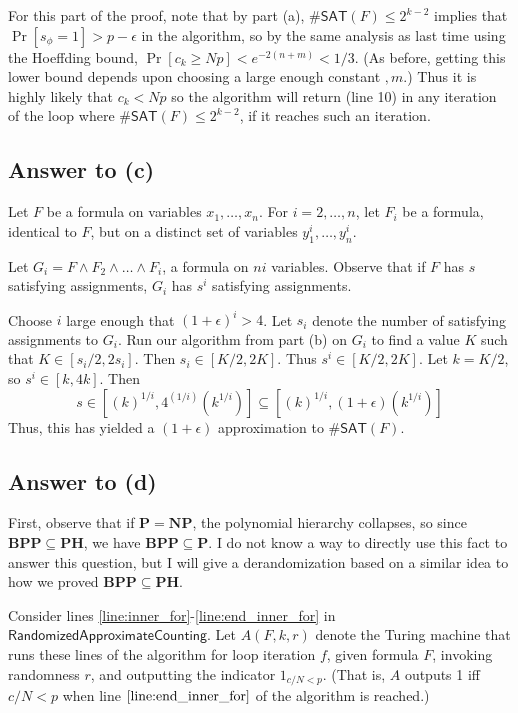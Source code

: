 \documentclass{article}
\renewcommand{\P}{\mathbf{P}}
\newcommand{\NP}{\mathbf{NP}}
\newcommand{\BPP}{\mathbf{BPP}}
\newcommand{\PH}{\mathbf{PH}}
\begin{document}
For this part of the proof, note that by part (a),
$\#\mathsf{SAT}(F) \leq 2^{k-2}$ implies that
$\Pr[s_\phi = 1] > p - \epsilon$ in the algorithm,
so by the same analysis as last time using the Hoeffding bound,
$\Pr[c_k \geq Np] < e^{-2(n + m)} < 1/3$.
(As before, getting this lower bound depends upon choosing a large enough constant $,m$.)
Thus it is highly likely that $c_k < Np$ so the algorithm will return (line 10)
in any iteration of the loop where $\#\mathsf{SAT}(F) \leq 2^{k-2}$,
if it reaches such an iteration.

\subsection*{Answer to (c)}

Let $F$ be a formula on variables $x_1, \dots, x_n$.
For $i = 2, \dots, n$, let $F_i$ be a formula, identical to $F$, but on a distinct set of variables $y^i_1, \dots, y^i_n$.

Let $G_i = F \wedge F_2 \wedge \dots \wedge F_i$, a formula on $ni$ variables.
Observe that if $F$ has $s$ satisfying assignments, $G_i$ has $s^i$ satisfying assignments.

Choose $i$ large enough that $(1 + \epsilon)^i > 4$.
Let $s_i$ denote the number of satisfying assignments to $G_i$.
Run our algorithm from part (b) on $G_i$ to find a value $K$ such that
$K \in [s_i/2, 2s_i]$.
Then $s_i \in [K/2, 2K]$.
Thus $s^i \in [K/2, 2K]$.
Let $k = K/2$, so $s^i \in [k, 4k]$.
Then $$s \in [(k)^{1/i}, 4^{(1/i)}(k^{1/i})] \subseteq [(k)^{1/i}, (1 + \epsilon)(k^{1/i})]$$
Thus, this has yielded a $(1 + \epsilon)$ approximation to $\#\mathsf{SAT}(F)$.

\subsection*{Answer to (d)}
First, observe that if $\P = \NP$, the polynomial hierarchy collapses, so since $\BPP \subseteq \PH$,
we have $\BPP \subseteq \P$.
I do not know a way to directly use this fact to answer this question, but I will give a derandomization based on a similar idea to how we proved $\BPP \subseteq \PH$.

Consider lines \ref{line:inner_for}-\ref{line:end_inner_for} in $\mathsf{RandomizedApproximateCounting}$.
Let $A(F, k, r)$ denote the Turing machine that runs these lines of the algorithm for loop iteration $f$, given formula $F$, invoking randomness $r$,
and outputting the indicator $1_{c/N < p}$. 
(That is, $A$ outputs 1 iff $c/N < p$ when line $\ref{line:end_inner_for}$ of the algorithm is reached.)
\end{document}

